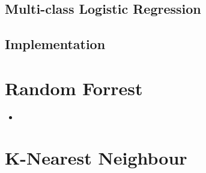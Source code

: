 \subsection{Multi-class Logistic Regression}

\subsection{Implementation}

\section{Random Forrest}

\begin{itemize}
\item
\end{itemize}



\section{K-Nearest Neighbour}


